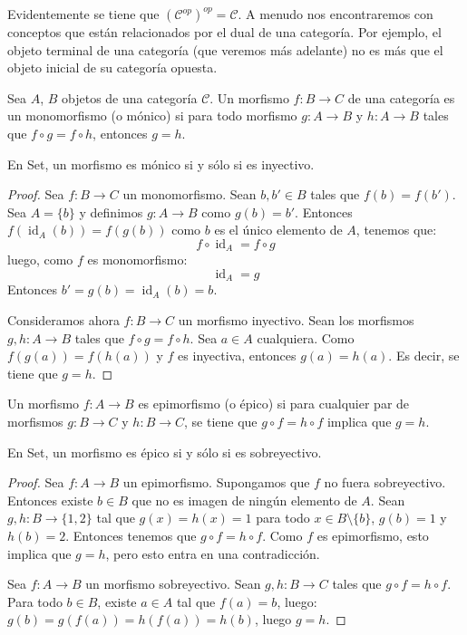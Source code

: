 \documentclass[12pt, twoside]{book}
\newcommand{\cat}{{\mathcal{C}}}
\newcommand{\Set}{{Set}}
\DeclareMathOperator{\id}{id}
\begin{document}
Evidentemente se tiene que $\left(\cat^{op}\right)^{op} = \cat$.
A menudo nos encontraremos con conceptos que están relacionados por el dual de una categoría.
Por ejemplo, el objeto terminal de una categoría (que veremos más adelante) no es más que el objeto inicial de su categoría opuesta.

\begin{definition}
Sea $A$, $B$ objetos de una categoría $\cat$.
Un morfismo $f \colon B \to C$ de una categoría es un monomorfismo (o mónico) si para todo morfismo $g \colon A \to B$ y $h \colon A \to B$ tales que $f \circ g = f \circ h$, entonces $g = h$.
\end{definition}

\begin{proposition}
En \Set, un morfismo es mónico si y sólo si es inyectivo.
\end{proposition}

\begin{proof}
Sea $f \colon B \to C$ un monomorfismo. Sean $b, b' \in B$ tales que $f(b) = f(b')$. Sea $A = \{b\}$ y definimos $g \colon A \to B$ como $g(b)=b'$.
Entonces $f(\id_A(b)) = f(g(b))$
como $b$ es el único elemento de $A$, tenemos que:
\[ f \circ \id_A = f \circ g \]
luego, como $f$ es monomorfismo:
\[ \id_A = g \]
Entonces $b'=g(b)=\id_A(b)=b$.

Consideramos ahora $f \colon B \to C$ un morfismo inyectivo.
Sean los morfismos $g, h \colon A \to B$ tales que $f \circ g = f \circ h$.
Sea $a \in A$ cualquiera. Como $f(g(a)) = f(h(a))$ y $f$ es inyectiva, entonces $g(a) = h(a)$.
Es decir, se tiene que $g = h$. 
\end{proof}

\begin{definition}
Un morfismo $f \colon A \to B$ es epimorfismo (o épico) si para cualquier par de morfismos $g \colon B \to C$ y $h \colon B \to C$, se tiene que $g \circ f = h \circ f$ implica que $g = h$.
\end{definition}

\begin{proposition}
En \Set, un morfismo es épico si y sólo si es sobreyectivo.
\end{proposition}

\begin{proof}
Sea $f \colon A \to B$ un epimorfismo. Supongamos que $f$ no fuera sobreyectivo. Entonces existe $b \in B$ que no es imagen de ningún elemento de $A$. Sean $g, h \colon B \to \{1,2\}$ tal que $g(x)=h(x)=1$ para todo $x \in B \setminus \{b\}$, $g(b) = 1$ y $h(b) = 2$. Entonces tenemos que $g \circ f = h \circ f$. Como $f$ es epimorfismo, esto implica que $g = h$, pero esto entra en una contradicción.

Sea $f \colon A \to B$ un morfismo sobreyectivo. Sean $g, h \colon B \to C$ tales que $g \circ f = h \circ f$. Para todo $b \in B$, existe $a \in A$ tal que $f(a)=b$, luego: $g(b) = g(f(a)) = h(f(a)) = h(b)$, luego $g = h$.
\end{proof}
\end{document}

